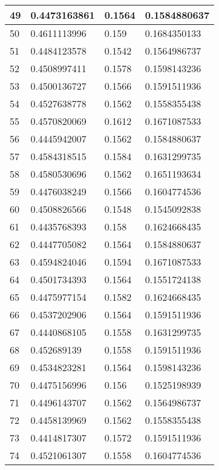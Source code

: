 \begin{table}[]
\begin{tabular}{|l|l|l|l|}
49    & 0.4473163861 & 0.1564       & 0.1584880637 \\ \hline
50    & 0.4611113996 & 0.159        & 0.1684350133 \\ \hline
51    & 0.4484123578 & 0.1542       & 0.1564986737 \\ \hline
52    & 0.4508997411 & 0.1578       & 0.1598143236 \\ \hline
53    & 0.4500136727 & 0.1566       & 0.1591511936 \\ \hline
54    & 0.4527638778 & 0.1562       & 0.1558355438 \\ \hline
55    & 0.4570820069 & 0.1612       & 0.1671087533 \\ \hline
56    & 0.4445942007 & 0.1562       & 0.1584880637 \\ \hline
57    & 0.4584318515 & 0.1584       & 0.1631299735 \\ \hline
58    & 0.4580530696 & 0.1562       & 0.1651193634 \\ \hline
59    & 0.4476038249 & 0.1566       & 0.1604774536 \\ \hline
60    & 0.4508826566 & 0.1548       & 0.1545092838 \\ \hline
61    & 0.4435768393 & 0.158        & 0.1624668435 \\ \hline
62    & 0.4447705082 & 0.1564       & 0.1584880637 \\ \hline
63    & 0.4594824046 & 0.1594       & 0.1671087533 \\ \hline
64    & 0.4501734393 & 0.1564       & 0.1551724138 \\ \hline
65    & 0.4475977154 & 0.1582       & 0.1624668435 \\ \hline
66    & 0.4537202906 & 0.1564       & 0.1591511936 \\ \hline
67    & 0.4440868105 & 0.1558       & 0.1631299735 \\ \hline
68    & 0.452689139  & 0.1558       & 0.1591511936 \\ \hline
69    & 0.4534823281 & 0.1564       & 0.1598143236 \\ \hline
70    & 0.4475156996 & 0.156        & 0.1525198939 \\ \hline
71    & 0.4496143707 & 0.1562       & 0.1564986737 \\ \hline
72    & 0.4458139969 & 0.1562       & 0.1558355438 \\ \hline
73    & 0.4414817307 & 0.1572       & 0.1591511936 \\ \hline
74    & 0.4521061307 & 0.1558       & 0.1604774536 \\ \hline

\end{tabular}
\end{table}
